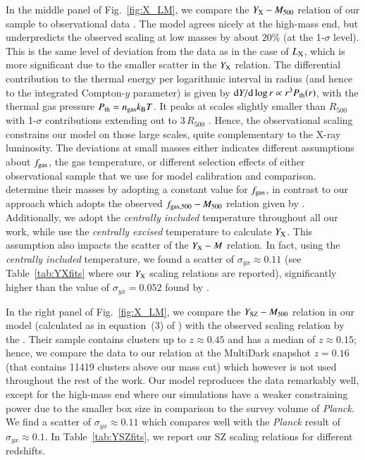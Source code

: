 \documentclass[useAMS,usenatbib]{mn2e}
\newcommand{\dd}{\mathrm{d}}
\begin{document}
In the middle panel of Fig.~\ref{fig:X_LM}, we compare the
$Y_{{\mathrm{X}}}-M_{500}$ relation of our sample to observational data
\citep{2010MNRAS.406.1773M}. The model agrees nicely at the high-mass end, but
underpredicts the observed scaling at low masses by about $20\%$ (at the
1-$\sigma$ level). This is the same level of deviation from the data as in the
case of $L_{{\mathrm{X}}}$, which is more significant due to the smaller scatter in
the $Y_{{\mathrm{X}}}$ relation. The differential contribution to the thermal energy
per logarithmic interval in radius (and hence to the integrated Compton-$y$
parameter) is given by $\dd Y /\dd\log r \propto r^3 P_{\rmn{th}}(r)$, with the
thermal gas pressure $P_{{\mathrm{th}}}=n_{{\mathrm{gas}}}k_{{\mathrm{B}}}T$. It peaks at
scales slightly smaller than $R_{500}$ with 1-$\sigma$ contributions extending
out to $3\,R_{500}$ \citep{2010ApJ...725...91B}. Hence, the observational
scaling constrains our model on those large scales, quite complementary to the
X-ray luminosity. The deviations at small masses either indicates different
assumptions about $f_{{\mathrm{gas}}}$, the gas temperature, or different selection
effects of either observational sample that we use for model calibration and
comparison.  \cite{2010MNRAS.406.1773M} determine their masses by adopting a
constant value for $f_{{\mathrm{gas}}}$, in contrast to our approach which adopts the
observed $f_{{\mathrm{gas}},500}-M_{500}$ relation given by
\cite{2009ApJ...693.1142S}. Additionally, we adopt the
\cite{2010MNRAS.406.1773M} \emph{centrally included} temperature throughout all
our work, while \cite{2010MNRAS.406.1773M} use the \emph{centrally excised}
temperature to calculate $Y_{{\mathrm{X}}}$. This assumption also impacts the scatter
of the $Y_{{\mathrm{X}}}-M$ relation. In fact, using the \emph{centrally included}
temperature, we found a scatter of $\sigma_{yx} \approx 0.11$ (see
Table~\ref{tab:YXfits} where our $Y_{{\mathrm{X}}}$ scaling relations are reported),
significantly higher than the value of $\sigma_{yx} = 0.052$ found by
\cite{2010MNRAS.406.1773M}.

In the right panel of Fig.~\ref{fig:X_LM}, we compare the
$Y_{{\mathrm{SZ}}}-M_{500}$ relation in our model (calculated as in equation~(3) of
\citealp{2011arXiv1109.3709B}) with the observed scaling relation by the
\cite{2011A&A...536A..11P}. Their sample contains clusters up to $z \approx
0.45$ and has a median of $z \approx 0.15$; hence, we compare the data to our
relation at the MultiDark snapshot $z=0.16$ (that contains 11419 clusters above
our mass cut) which however is not used throughout the rest of the work. Our
model reproduces the data remarkably well, except for the high-mass end where
our simulations have a weaker constraining power due to the smaller box size in
comparison to the survey volume of {\em Planck}.  We find a scatter of
$\sigma_{yx} \approx 0.11$ which compares well with the \emph{Planck} result of
$\sigma_{yx} \approx 0.1$. In Table~\ref{tab:YSZfits}, we report our SZ scaling
relations for different redshifts.
 
\end{document}

